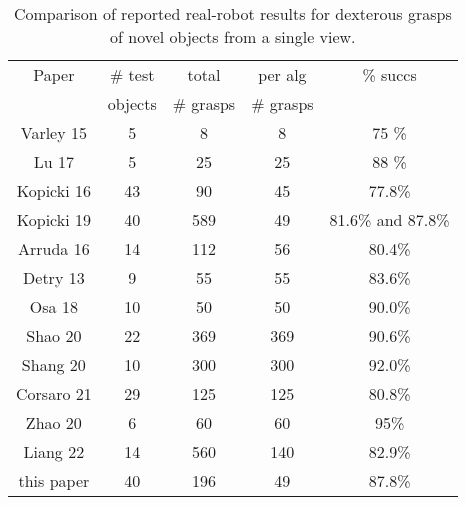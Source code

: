 \begin{table}[t]
\small
\begin{center}
\caption{Comparison of reported real-robot results for dexterous grasps of novel objects from a single view. \label{tab:robot-results-comparison}}
\begin{tabular}{|c|c|c|c|c|} \hline
Paper & \# test   & total         & per alg     & \% succs \\ \
           & objects & \# grasps & \# grasps &              \\ \hline
Varley 15 \cite{varley2015generating} & 5  & 8 & 8  & 75 \%\\
Lu  17 \cite{lu2017planning} & 5 & 25  & 25 & 88  \% \\
Kopicki 16 \cite{kopicki2015ijrr} & 43 & 90  & 45 & 77.8\% \\
Kopicki 19 \cite{kopicki2019ijrr} & 40 & 589  & 49 & 81.6\% and 87.8\% \\
Arruda 16 \cite{arruda2016active} & 14 & 112 & 56 & 80.4\% \\
Detry 13 \cite{detry2013a} & 9 & 55 & 55 & 83.6\% \\
Osa 18  \cite{Osa2018} & 10  & 50 & 50 & 90.0\%\\
Shao 20 \cite{Shao2020} & 22 & 369 & 369 & 90.6\% \\
Shang 20 \cite{Shang2020} & 10 & 300 & 300 & 92.0\% \\
Corsaro 21 \cite{Corsaro2021} & 29 & 125 & 125 & 80.8\% \\
Zhao 20 \cite{Zhao2020} & 6 & 60 & 60 & 95\% \\
Liang 22 \cite{Liang22} & 14 & 560 & 140 & 82.9\% \\
this paper  & 40 & 196 & 49 & 87.8\% \\
\hline
\end{tabular}
\end{center}
\end{table}
